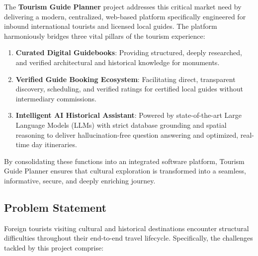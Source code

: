 \documentclass[12pt,a4paper,twoside,openright]{report}
\begin{document}
The \textbf{Tourism Guide Planner} project addresses this critical market need by delivering a modern, centralized, web-based platform specifically engineered for inbound international tourists and licensed local guides. The platform harmoniously bridges three vital pillars of the tourism experience:
\begin{enumerate}[leftmargin=*]
    \item \textbf{Curated Digital Guidebooks}: Providing structured, deeply researched, and verified architectural and historical knowledge for monuments.
    \item \textbf{Verified Guide Booking Ecosystem}: Facilitating direct, transparent discovery, scheduling, and verified ratings for certified local guides without intermediary commissions.
    \item \textbf{Intelligent AI Historical Assistant}: Powered by state-of-the-art Large Language Models (LLMs) with strict database grounding and spatial reasoning to deliver hallucination-free question answering and optimized, real-time day itineraries.
\end{enumerate}

By consolidating these functions into an integrated software platform, Tourism Guide Planner ensures that cultural exploration is transformed into a seamless, informative, secure, and deeply enriching journey.

\subsection{Problem Statement}

Foreign tourists visiting cultural and historical destinations encounter structural difficulties throughout their end-to-end travel lifecycle. Specifically, the challenges tackled by this project comprise:
\end{document}
